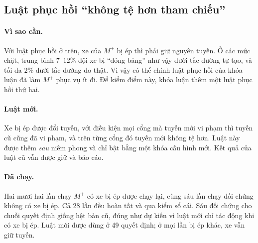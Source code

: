 \subsection{Luật phục hồi ``không tệ hơn tham chiếu''}

\paragraph{Vì sao cần.} Với luật phục hồi ở trên, xe của $M^{+}$ bị ép thì phải giữ nguyên tuyến. Ở các
mức chặt, trung bình $7$--$12\%$ đội xe bị ``đóng băng'' như vậy dưới tắc đường tự tạo, và tối đa $2\%$
dưới tắc đường đo thật. Vì vậy có thể chính luật phục hồi của khóa luận đã làm $M^{+}$ phục vụ ít đi. Để kiểm điểm này, khóa luận thêm một luật phục hồi thứ hai.

\paragraph{Luật mới.} Xe bị ép được đổi tuyến, với điều kiện mọi cổng mà tuyến mới vi phạm thì tuyến cũ
cũng đã vi phạm, và trên từng cổng đó tuyến mới không tệ hơn. Luật này được thêm \emph{sau} niêm phong
và chỉ bật bằng một khóa cấu hình mới. Kết quả của luật cũ vẫn được giữ và báo cáo.

\paragraph{Đã chạy.} Hai mươi hai lần chạy $M^{+}$ có xe bị ép được chạy lại, cùng sáu lần chạy đối
chứng không có xe bị ép. Cả 28 lần đều hoàn tất và qua kiểm sổ cái. Sáu đối chứng cho chuỗi quyết định
giống hệt bản cũ, đúng như dự kiến vì luật mới chỉ tác động khi có xe bị ép. Luật mới được dùng ở 49
quyết định; ở mọi lần bị ép khác, xe vẫn giữ tuyến.


